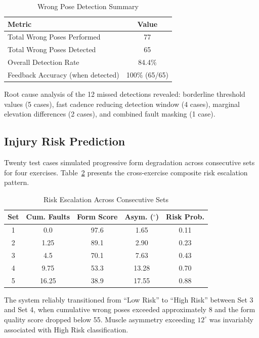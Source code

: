 \documentclass[conference]{IEEEtran}
\begin{document}
\begin{table}[htbp]
\caption{Wrong Pose Detection Summary}
\begin{center}
\begin{tabular}{|l|c|}
\hline
\textbf{Metric} & \textbf{Value} \\
\hline
Total Wrong Poses Performed & 77 \\
Total Wrong Poses Detected & 65 \\
Overall Detection Rate & 84.4\% \\
Feedback Accuracy (when detected) & 100\% (65/65) \\
\hline
\end{tabular}
\label{tab:posesummary}
\end{center}
\end{table}

Root cause analysis of the 12 missed detections revealed: borderline threshold values (5 cases), fast cadence reducing detection window (4 cases), marginal elevation differences (2 cases), and combined fault masking (1 case).

\subsection{Injury Risk Prediction}

Twenty test cases simulated progressive form degradation across consecutive sets for four exercises. Table~\ref{tab:riskresults} presents the cross-exercise composite risk escalation pattern.

\begin{table}[htbp]
\caption{Risk Escalation Across Consecutive Sets}
\begin{center}
\begin{tabular}{|c|c|c|c|c|}
\hline
\textbf{Set} & \textbf{Cum. Faults} & \textbf{Form Score} & \textbf{Asym. ($^\circ$)} & \textbf{Risk Prob.} \\
\hline
1 & 0.0 & 97.6 & 1.65 & 0.11 \\
2 & 1.25 & 89.1 & 2.90 & 0.23 \\
3 & 4.5 & 70.1 & 7.63 & 0.43 \\
4 & 9.75 & 53.3 & 13.28 & 0.70 \\
5 & 16.25 & 38.9 & 17.55 & 0.88 \\
\hline
\end{tabular}
\label{tab:riskresults}
\end{center}
\end{table}

The system reliably transitioned from ``Low Risk'' to ``High Risk'' between Set 3 and Set 4, when cumulative wrong poses exceeded approximately 8 and the form quality score dropped below 55. Muscle asymmetry exceeding $12^\circ$ was invariably associated with High Risk classification.
\end{document}
